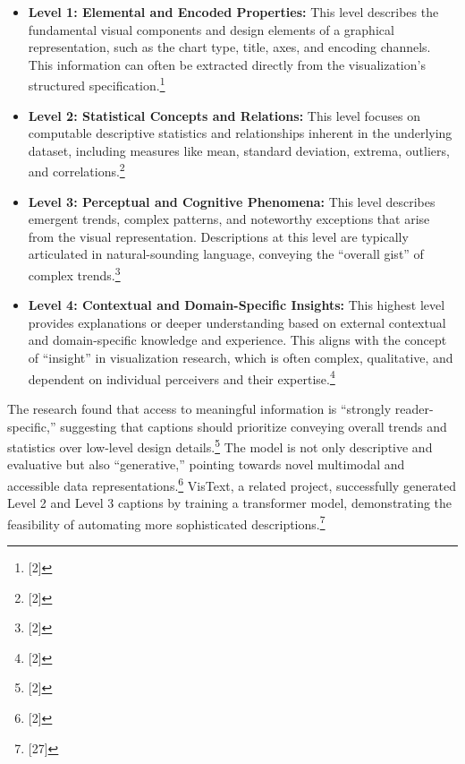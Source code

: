 \begin{itemize}
    \item \textbf{Level 1: Elemental and Encoded Properties:} This level describes the fundamental visual components and design elements of a graphical representation, such as the chart type, title, axes, and encoding channels. This information can often be extracted directly from the visualization's structured specification.\footnote{[2]}
    \item \textbf{Level 2: Statistical Concepts and Relations:} This level focuses on computable descriptive statistics and relationships inherent in the underlying dataset, including measures like mean, standard deviation, extrema, outliers, and correlations.\footnote{[2]}
    \item \textbf{Level 3: Perceptual and Cognitive Phenomena:} This level describes emergent trends, complex patterns, and noteworthy exceptions that arise from the visual representation. Descriptions at this level are typically articulated in natural-sounding language, conveying the ``overall gist'' of complex trends.\footnote{[2]}
    \item \textbf{Level 4: Contextual and Domain-Specific Insights:} This highest level provides explanations or deeper understanding based on external contextual and domain-specific knowledge and experience. This aligns with the concept of ``insight'' in visualization research, which is often complex, qualitative, and dependent on individual perceivers and their expertise.\footnote{[2]}
\end{itemize}

The research found that access to meaningful information is ``strongly reader-specific,'' suggesting that captions should prioritize conveying overall trends and statistics over low-level design details.\footnote{[2]} The model is not only descriptive and evaluative but also ``generative,'' pointing towards novel multimodal and accessible data representations.\footnote{[2]} VisText, a related project, successfully generated Level 2 and Level 3 captions by training a transformer model, demonstrating the feasibility of automating more sophisticated descriptions.\footnote{[27]}


